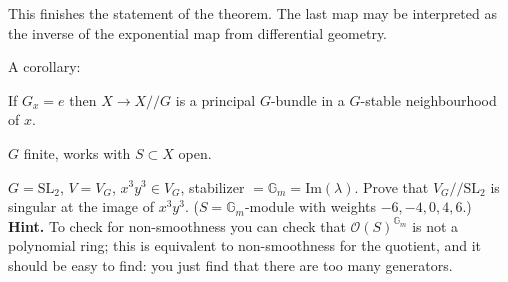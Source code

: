 This finishes the statement of the theorem.
The last map may be interpreted as the
inverse of the exponential map from
differential geometry.

A corollary:

\begin{corollary}
\label{lemma-}
If $G_x=e$ then $X \to X/\!/G$ is a principal
$G$-bundle in a $G$-stable neighbourhood of
$x$.
\end{corollary}

\begin{exercise}
\label{git-label-017}
$G$ finite, works with $S\subset X$ open.
\end{exercise}

\begin{exercise}
\label{exercise-}
$G=\text{SL}_2$, $V=V_G$, $x^3y^3 \in V_G$,
stabilizer
$=\mathbb{G}_m=\text{Im}(\lambda)$. Prove
that $V_G/\!/\text{SL}_2$ is singular at the
image of $x^3y^3$. ($S=\mathbb{G}_m$-module
with weights $-6,-4,0,4,6$.) {\bf Hint.} To
check for non-smoothness you can check that
$\mathcal{O}(S)^{\mathbb{G}_m}$ is not a
polynomial ring; this is equivalent to
non-smoothness for the quotient, and it
should be easy to find: you just find that
there are too many generators.
\end{exercise}





